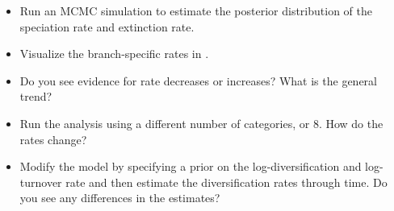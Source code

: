 \begin{itemize}
\item Run an MCMC simulation to estimate the posterior distribution of the speciation rate and extinction rate.
\item Visualize the branch-specific rates in \FigTree.
\item Do you see evidence for rate decreases or increases? What is the general trend?
\item Run the analysis using a different number of categories,  or 8. How do the rates change?
\item Modify the model by specifying a prior on the log-diversification and log-turnover rate and then estimate the diversification rates through time. Do you see any differences in the estimates?
\end{itemize}






